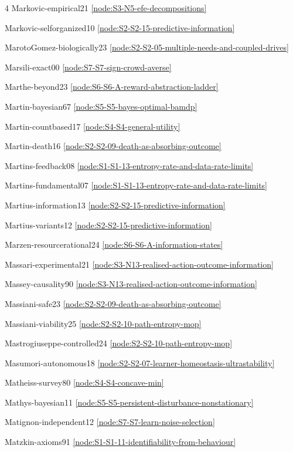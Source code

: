 \documentclass[10pt]{article}
\begin{document}
{\begin{multicols}{4}
Markovic-empirical21 \hfill \ref{node:S3-N5-efe-decompositions}\par
Markovic-selforganized10 \hfill \ref{node:S2-S2-15-predictive-information}\par
MarotoGomez-biologically23 \hfill \ref{node:S2-S2-05-multiple-needs-and-coupled-drives}\par
Marsili-exact00 \hfill \ref{node:S7-S7-sign-crowd-averse}\par
Marthe-beyond23 \hfill \ref{node:S6-S6-A-reward-abstraction-ladder}\par
Martin-bayesian67 \hfill \ref{node:S5-S5-bayes-optimal-bamdp}\par
Martin-countbased17 \hfill \ref{node:S4-S4-general-utility}\par
Martin-death16 \hfill \ref{node:S2-S2-09-death-as-absorbing-outcome}\par
Martins-feedback08 \hfill \ref{node:S1-S1-13-entropy-rate-and-data-rate-limits}\par
Martins-fundamental07 \hfill \ref{node:S1-S1-13-entropy-rate-and-data-rate-limits}\par
Martius-information13 \hfill \ref{node:S2-S2-15-predictive-information}\par
Martius-variants12 \hfill \ref{node:S2-S2-15-predictive-information}\par
Marzen-resourcerational24 \hfill \ref{node:S6-S6-A-information-states}\par
Massari-experimental21 \hfill \ref{node:S3-N13-realised-action-outcome-information}\par
Massey-causality90 \hfill \ref{node:S3-N13-realised-action-outcome-information}\par
Massiani-safe23 \hfill \ref{node:S2-S2-09-death-as-absorbing-outcome}\par
Massiani-viability25 \hfill \ref{node:S2-S2-10-path-entropy-mop}\par
Mastrogiuseppe-controlled24 \hfill \ref{node:S2-S2-10-path-entropy-mop}\par
Masumori-autonomous18 \hfill \ref{node:S2-S2-07-learner-homeostasis-ultrastability}\par
Matheiss-survey80 \hfill \ref{node:S4-S4-concave-min}\par
Mathys-bayesian11 \hfill \ref{node:S5-S5-persistent-disturbance-nonstationary}\par
Matignon-independent12 \hfill \ref{node:S7-S7-learn-noise-selection}\par
Matzkin-axioms91 \hfill \ref{node:S1-S1-11-identifiability-from-behaviour}\par

\end{multicols}}
\end{document}
